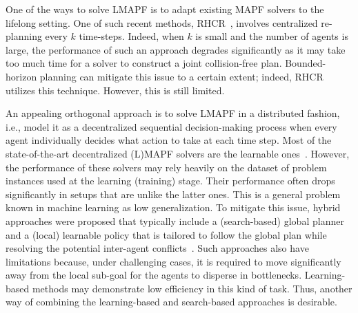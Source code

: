 \documentclass[letterpaper]{article} %
\begin{document}
One of the ways to solve LMAPF is to adapt existing MAPF solvers to the lifelong setting. One of such recent methods, RHCR~\cite{li2021lifelong}, involves centralized re-planning every $k$ time-steps. Indeed, when $k$ is small and the number of agents is large, the performance of such an approach degrades significantly as it may take too much time for a solver to construct a joint collision-free plan. Bounded-horizon planning can mitigate this issue to a certain extent; indeed, RHCR utilizes this technique. However, this is still limited. 

An appealing orthogonal approach is to solve LMAPF in a distributed fashion, i.e., model it as a decentralized sequential decision-making process when every agent individually decides what action to take at each time step. Most of the state-of-the-art decentralized (L)MAPF solvers are the learnable ones~\cite{sartoretti2019primal,damani2021primal,ma2021distributed,Li2022MultiAgentPF}. However, the performance of these solvers may rely heavily on the dataset of problem instances used at the learning (training) stage. Their performance often drops significantly in setups that are unlike the latter ones. This is a general problem known in machine learning as low generalization. To mitigate this issue, hybrid approaches were proposed that typically include a (search-based) global planner and a (local) learnable policy that is tailored to follow the global plan while resolving the potential inter-agent conflicts~\cite{Wang2020,9340876}. Such approaches also have limitations because, under challenging cases, it is required to move significantly away from the local sub-goal for the agents to disperse in bottlenecks. Learning-based methods may demonstrate low efficiency in this kind of task. Thus, another way of combining the learning-based and search-based approaches is desirable.
\end{document}
